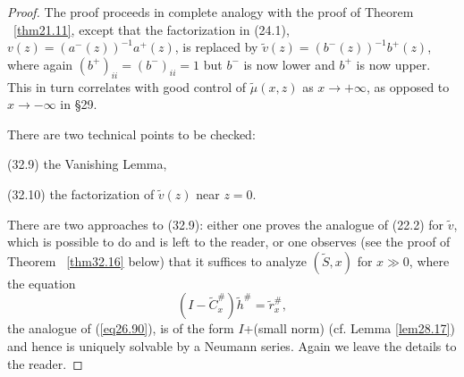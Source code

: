 \documentclass{surv-l}
\theoremstyle{plain}
\theoremstyle{definition}
\numberwithin{equation}{chapter}
\begin{document}
\begin{proof}
The proof proceeds in complete analogy with the proof of Theorem ~\ref{thm21.11}, except that the factorization in (24.1), $v(z)=(a^{-}(z))^{-1}a^{+}(z)$, is replaced by $\tilde{v}(z)=(b^{-}(z))^{-1}b^{+}(z)$, where again $(b^{+})_{ii}=(b^{-})_{ii}=1$ but $b^{-}$ is now lower and $b^{+}$ is now upper. This in turn correlates with good control of $\tilde{\mu}(x, z)$ as $ x\rightarrow+\infty$, as opposed to $x \rightarrow-\infty$ in \S 29.

There are two technical points to be checked:

(32.9) the Vanishing Lemma,

(32.10) the factorization of $\tilde{v}(z)$ near $z=0$.

There are two approaches to (32.9): either one proves the analogue of (22.2) for $\tilde{v}$, which is possible to do and is left to the reader, or one observes (see the proof of Theorem ~\ref{thm32.16} below) that it suffices to analyze $(\tilde{S}, x)$ for $x\gg 0$, where the equation
\setcounter{equation}{10}
\begin{equation}\label{eq32.11}
(I-\tilde{C}_{x}^{\#})\tilde{h}^{\#}=\tilde{r}_{x}^{\#},
\end{equation}
the analogue of (\ref{eq26.90}), is of the form $I$+(small norm) (cf. Lemma \ref{lem28.17}) and hence is uniquely solvable by a Neumann series. Again we leave the details to the reader.


\end{proof}
\end{document}
